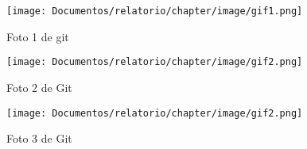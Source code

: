 \begin{figure}[htb]
\centering
\texttt{[image: Documentos/relatorio/chapter/image/gif1.png]}
\caption{Foto 1 de git}
\label{fig:1}
\end{figure}

\begin{figure}[htb]
\centering
\texttt{[image: Documentos/relatorio/chapter/image/gif2.png]}
\caption{Foto 2 de Git}
\label{fig:2}
\end{figure}

\begin{figure}[htb]
\centering
\texttt{[image: Documentos/relatorio/chapter/image/gif2.png]}
\caption{Foto 3 de Git}
\label{fig:3}
\end{figure}
